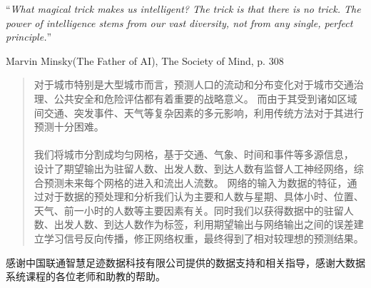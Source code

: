 \documentclass[
11pt, %
english, %
singlespacing, %
headsepline, %
]{MastersDoctoralThesis} %
\begin{document}
\cleardoublepage


\vspace*{0.2\textheight}

\noindent\enquote{\itshape What magical trick makes us intelligent? The trick is that there is no trick. The power of intelligence stems from our vast diversity, not from any single, perfect principle.}\bigbreak

\hfill Marvin Minsky(The Father of AI), The Society of Mind, p. 308


\begin{abstract}
\addchaptertocentry{\abstractname} %
对于城市特别是大型城市而言，预测人口的流动和分布变化对于城市交通治理、公共安全和危险评估都有着重要的战略意义。 而由于其受到诸如区域间交通、突发事件、天气等复杂因素的多元影响，利用传统方法对于其进行预测十分困难。\\
\\
我们将城市分割成均匀网格，基于交通、气象、时间和事件等多源信息，
设计了期望输出为驻留人数、出发人数、到达人数有监督人工神经网络，综合预测未来每个网格的进入和流出人流数。 网络的输入为数据的特征，通过对于数据的预处理和分析我们认为主要和人数与星期、具体小时、位置、天气、前一小时的人数等主要因素有关。同时我们以获得数据中的驻留人数、出发人数、到达人数作为标签，利用期望输出与网络输出之间的误差建立学习信号反向传播，修正网络权重，最终得到了相对较理想的预测结果。
\end{abstract}


\begin{acknowledgements}
\addchaptertocentry{\acknowledgementname} %
感谢中国联通智慧足迹数据科技有限公司提供的数据支持和相关指导，感谢大数据系统课程的各位老师和助教的帮助。
\end{acknowledgements}

\end{document}
